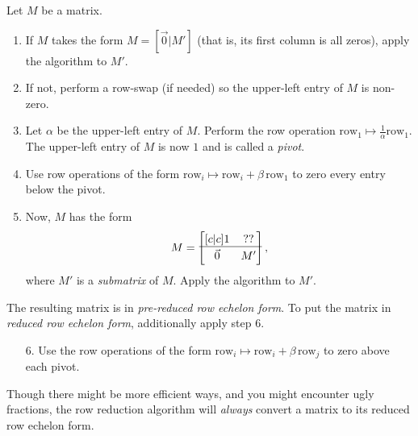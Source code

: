 	\begin{definition}
		Let $M$ be a matrix.
		\begin{enumerate}
			\item If $M$ takes the form $M=[\vec 0|M']$ (that is, its first column
			is all zeros), apply the algorithm to $M'$.
		\item If not, perform a row-swap (if needed) so the upper-left entry of $M$ is
				non-zero.
			\item Let $\alpha$ be the upper-left entry of $M$. 
				Perform the row operation $\text{row}_1\mapsto \tfrac{1}{\alpha}\text{row}_1$.
				The upper-left entry of $M$ is now $1$ and is called a 
				\emph{pivot}.
			\item Use row operations of the form $\text{row}_i\mapsto \text{row}_i+\beta\,\text{row}_1$
			to zero every entry below the pivot.
			\item Now, $M$ has the form
			\[
				M=\begin{bmatrix}[c|c]
					1 & ??\\
					\hline\\[\dimexpr-\normalbaselineskip+2pt]
					\vec 0 & M'
				\end{bmatrix},
			\]
			where $M'$ is a {\it submatrix} of $M$.
			Apply the algorithm to $M'$.

		\end{enumerate}

		The resulting matrix is in \emph{pre-reduced row echelon form}. To put the matrix in 
		\emph{reduced row echelon form}, additionally apply step 6.
		\begin{enumerate}
			\item[6.] Use the row operations of the form $\text{row}_i\mapsto \text{row}_i+\beta\,\text{row}_j$
			to zero above each pivot.
		\end{enumerate}
	\end{definition}

	Though there might be more efficient ways, and you might encounter ugly fractions, the row reduction algorithm will
	\emph{always} convert a matrix to its reduced row echelon form.

